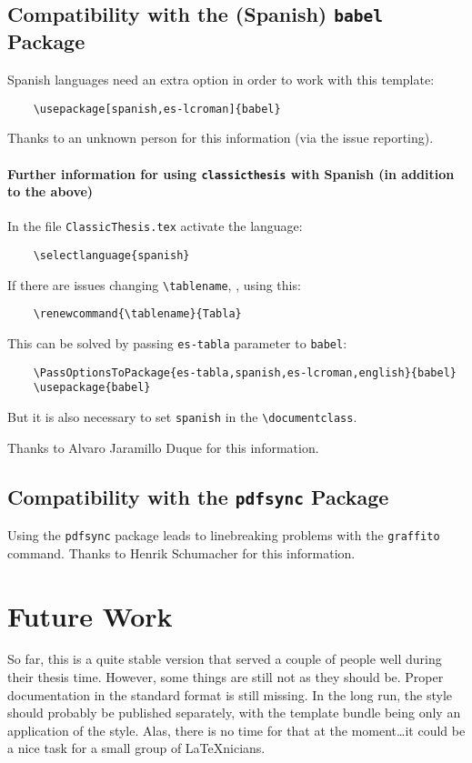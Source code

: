 \subsection*{Compatibility with the (Spanish) \texttt{babel} Package}
Spanish languages need an extra option in order to work with this template:
\begin{lstlisting}
    \usepackage[spanish,es-lcroman]{babel}
\end{lstlisting}
Thanks to an unknown person for this information (via the issue reporting). 


\paragraph{Further information for using \texttt{classicthesis} with Spanish (in addition to the above)}
In the file \texttt{ClassicThesis.tex} activate the language: 
\begin{lstlisting}
    \selectlanguage{spanish}
\end{lstlisting}
    
If there are issues changing \verb|\tablename|, \eg, using this:
\begin{lstlisting}
    \renewcommand{\tablename}{Tabla}
\end{lstlisting}

This can be solved by passing \texttt{es-tabla} parameter to \texttt{babel}:
\begin{lstlisting}
    \PassOptionsToPackage{es-tabla,spanish,es-lcroman,english}{babel}
    \usepackage{babel}
\end{lstlisting}

But it is also necessary to set \texttt{spanish} in the \verb|\documentclass|.

Thanks to Alvaro Jaramillo Duque for this information. 


\subsection*{Compatibility with the \texttt{pdfsync} Package}
Using the \texttt{pdfsync} package leads to linebreaking problems with the \texttt{graffito} command. 
Thanks to Henrik Schumacher for this information. 



\section{Future Work}
So far, this is a quite stable version that served a couple of people
well during their thesis time. However, some things are still not as
they should be. Proper documentation in the standard format is still
missing. In the long run, the style should probably be published
separately, with the template bundle being only an application of the
style. Alas, there is no time for that at the moment\dots it could be
a nice task for a small group of \LaTeX nicians.

